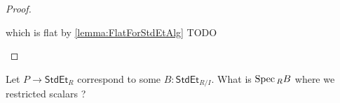 \begin{proof}
\begin{itemize}
		 which is flat by \ref{lemma:FlatForStdEtAlg} TODO
	\end{itemize}
\end{proof}
\begin{question}
	Let $P \to \mathsf{StdEt}_R$ correspond to some $B : \mathsf{StdEt}_{R / I}$. What is $\operatorname{Spec} {}_R B$ where we restricted scalars ?
\end{question}




